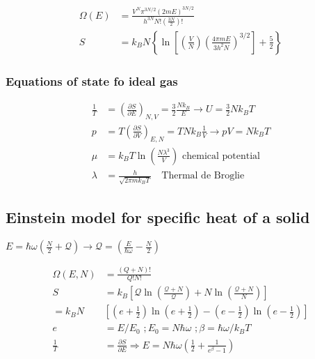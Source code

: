 \[
    \begin{aligned}
        \Omega(E) &= \frac{V^N \pi^{3N/2} (2mE)^{3N/2}}{h^{3N}N!\left( \frac{3N}{2} \right)!} \\
        S &= k_B N \left\lbrace \ln \left[ \left( \frac{V}{N} \right) \left( \frac{4 \pi m E}{3 h^2 N} \right)^{3/2} \right] + \frac{5}{2}\right\rbrace
    \end{aligned}
\]


\subsubsection*{Equations of state fo ideal gas}

\[
    \begin{aligned}
        \frac{1}{T} &= \left(\frac{\partial S}{\partial E}\right)_{N,V} = \frac{3}{2} \frac{Nk_B}{E} \rightarrow U = \frac{3}{2} N k_B T \\
        p &= T\left(\frac{\partial S}{\partial V}\right)_{E,N} = TNk_B \frac{1}{V}\rightarrow pV = N k_B T \\
        \mu &= k_B T \ln \left(\frac{N\lambda^3}{V}\right) \text{ chemical potential} \\
        \lambda &= \frac{h}{\sqrt{2 \pi m k_B T}} \quad \text{Thermal de Broglie}
    \end{aligned}
\]

\subsection*{Einstein model for specific heat of a solid}
$E = \hbar \omega \left(\frac{N}{2} + \mathcal{Q}\right) \rightarrow \mathcal{Q} = \left(\frac{E}{\hbar \omega} - \frac{N}{2}\right)$

\[
    \begin{aligned}
        \Omega(E,N) &= \frac{(Q+N)!}{Q!N!} \\
        S &= k_B \left[\mathcal{Q}\ln \left(\frac{\mathcal{Q}+N}{\mathcal{Q}}\right) + N \ln \left(\frac{\mathcal{Q}+N}{N}\right)\right] \\
          = k_B N &\left[(e + \frac{1}{2}) \ln (e + \frac{1}{2})- (e-\frac{1}{2}) \ln (e- \frac{1}{2})\right] \\
          e &= E/E_0 \,\, ; E_0 = N \hbar \omega \,\, ; \beta = \hbar \omega / k_B T \\
          \frac{1}{T} &= \frac{\partial S}{\partial E} \Rightarrow E = N \hbar \omega \left(\frac{1}{2} + \frac{1}{e^\beta -1}\right)
    \end{aligned}
\]

